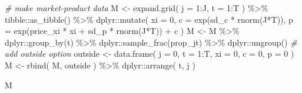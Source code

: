 \documentclass[
]{book}
\newenvironment{Shaded}{\begin{snugshade}}{\end{snugshade}}
\newcommand{\AttributeTok}[1]{\textcolor[rgb]{0.77,0.63,0.00}{#1}}
\newcommand{\CommentTok}[1]{\textcolor[rgb]{0.56,0.35,0.01}{\textit{#1}}}
\newcommand{\DecValTok}[1]{\textcolor[rgb]{0.00,0.00,0.81}{#1}}
\newcommand{\FunctionTok}[1]{\textcolor[rgb]{0.00,0.00,0.00}{#1}}
\newcommand{\NormalTok}[1]{#1}
\newcommand{\OtherTok}[1]{\textcolor[rgb]{0.56,0.35,0.01}{#1}}
\newcommand{\SpecialCharTok}[1]{\textcolor[rgb]{0.00,0.00,0.00}{#1}}
\begin{document}
\begin{Shaded}
\begin{Highlighting}[]
\CommentTok{\# make market{-}product data}
\NormalTok{M }\OtherTok{\textless{}{-}} 
  \FunctionTok{expand.grid}\NormalTok{(}
    \AttributeTok{j =} \DecValTok{1}\SpecialCharTok{:}\NormalTok{J, }
    \AttributeTok{t =} \DecValTok{1}\SpecialCharTok{:}\NormalTok{T}
\NormalTok{    ) }\SpecialCharTok{\%\textgreater{}\%}
\NormalTok{  tibble}\SpecialCharTok{::}\FunctionTok{as\_tibble}\NormalTok{() }\SpecialCharTok{\%\textgreater{}\%}
\NormalTok{  dplyr}\SpecialCharTok{::}\FunctionTok{mutate}\NormalTok{(}
    \AttributeTok{xi =} \DecValTok{0}\NormalTok{,}
    \AttributeTok{c =} \FunctionTok{exp}\NormalTok{(sd\_c }\SpecialCharTok{*} \FunctionTok{rnorm}\NormalTok{(J}\SpecialCharTok{*}\NormalTok{T)),}
    \AttributeTok{p =} \FunctionTok{exp}\NormalTok{(price\_xi }\SpecialCharTok{*}\NormalTok{ xi }\SpecialCharTok{+}\NormalTok{ sd\_p }\SpecialCharTok{*} \FunctionTok{rnorm}\NormalTok{(J}\SpecialCharTok{*}\NormalTok{T)) }\SpecialCharTok{+}\NormalTok{ c}
\NormalTok{  ) }
\NormalTok{M }\OtherTok{\textless{}{-}} 
\NormalTok{  M }\SpecialCharTok{\%\textgreater{}\%}
\NormalTok{  dplyr}\SpecialCharTok{::}\FunctionTok{group\_by}\NormalTok{(t) }\SpecialCharTok{\%\textgreater{}\%}
\NormalTok{  dplyr}\SpecialCharTok{::}\FunctionTok{sample\_frac}\NormalTok{(prop\_jt) }\SpecialCharTok{\%\textgreater{}\%}
\NormalTok{  dplyr}\SpecialCharTok{::}\FunctionTok{ungroup}\NormalTok{()}
\CommentTok{\# add outside option}
\NormalTok{outside }\OtherTok{\textless{}{-}} 
  \FunctionTok{data.frame}\NormalTok{(}
    \AttributeTok{j =} \DecValTok{0}\NormalTok{, }
    \AttributeTok{t =} \DecValTok{1}\SpecialCharTok{:}\NormalTok{T, }
    \AttributeTok{xi =} \DecValTok{0}\NormalTok{, }
    \AttributeTok{c =} \DecValTok{0}\NormalTok{, }
    \AttributeTok{p =} \DecValTok{0}
\NormalTok{    )}
\NormalTok{M }\OtherTok{\textless{}{-}} 
  \FunctionTok{rbind}\NormalTok{(}
\NormalTok{    M,}
\NormalTok{    outside}
\NormalTok{    ) }\SpecialCharTok{\%\textgreater{}\%}
\NormalTok{  dplyr}\SpecialCharTok{::}\FunctionTok{arrange}\NormalTok{(}
\NormalTok{    t, }
\NormalTok{    j}
\NormalTok{    )}
\end{Highlighting}
\end{Shaded}

\begin{Shaded}
\begin{Highlighting}[]
\NormalTok{M}
\end{Highlighting}
\end{Shaded}
\end{document}
